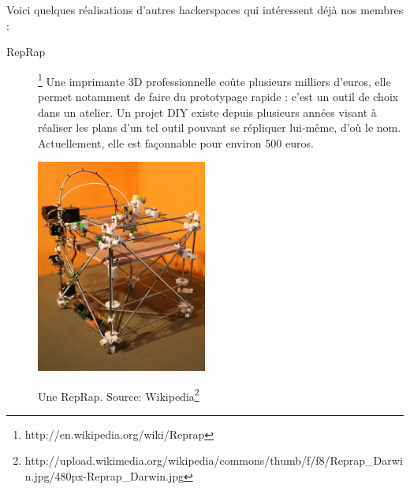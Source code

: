 \documentclass{article}
\begin{document}
Voici quelques réalisations d'autres hackerspaces qui intéressent déjà nos membres :
\begin{description}
\item[RepRap]\footnote{http://en.wikipedia.org/wiki/Reprap} Une imprimante 3D professionnelle coûte plusieurs milliers d'euros, elle permet notamment de faire du prototypage rapide : c'est un outil de choix dans un atelier. Un projet DIY existe depuis plusieurs années visant à réaliser les plans d'un tel outil pouvant se répliquer lui-même, d'où le nom. Actuellement, elle est façonnable pour environ 500 euros.

\begin{center}
\includegraphics[height=70mm]{reprap-darwin.jpg}

Une RepRap. Source: Wikipedia\footnote{http://upload.wikimedia.org/wikipedia/commons/thumb/f/f8/Reprap\_Darwin.jpg/480px-Reprap\_Darwin.jpg}
\end{center}


\end{description}
\end{document}
